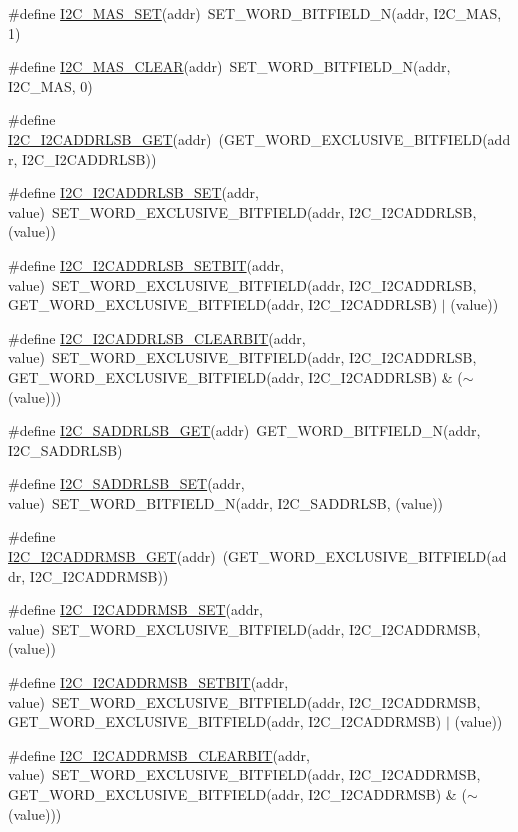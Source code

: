 \begin{DoxyCompactItemize}
\item 
\#define \hyperlink{a00557_aeb24282b8212aa301e882f01f5095530}{I2C\_\-MAS\_\-SET}(addr)~SET\_\-WORD\_\-BITFIELD\_\-N(addr, I2C\_\-MAS, 1)
\item 
\#define \hyperlink{a00557_a5f774c19bde66978bd546c0fa80bc329}{I2C\_\-MAS\_\-CLEAR}(addr)~SET\_\-WORD\_\-BITFIELD\_\-N(addr, I2C\_\-MAS, 0)
\item 
\#define \hyperlink{a00557_ad30f12598a025bf39ae94fba0321454c}{I2C\_\-I2CADDRLSB\_\-GET}(addr)~(GET\_\-WORD\_\-EXCLUSIVE\_\-BITFIELD(addr, I2C\_\-I2CADDRLSB))
\item 
\#define \hyperlink{a00557_a43523c6228f8a23711eb17e71acc91ff}{I2C\_\-I2CADDRLSB\_\-SET}(addr, value)~SET\_\-WORD\_\-EXCLUSIVE\_\-BITFIELD(addr, I2C\_\-I2CADDRLSB, (value))
\item 
\#define \hyperlink{a00557_a4551347f7b9dda948878fc6e37fe4370}{I2C\_\-I2CADDRLSB\_\-SETBIT}(addr, value)~SET\_\-WORD\_\-EXCLUSIVE\_\-BITFIELD(addr, I2C\_\-I2CADDRLSB, GET\_\-WORD\_\-EXCLUSIVE\_\-BITFIELD(addr, I2C\_\-I2CADDRLSB) $|$ (value))
\item 
\#define \hyperlink{a00557_a0dcf201bcd0928382c78f1a2be622ebe}{I2C\_\-I2CADDRLSB\_\-CLEARBIT}(addr, value)~SET\_\-WORD\_\-EXCLUSIVE\_\-BITFIELD(addr, I2C\_\-I2CADDRLSB, GET\_\-WORD\_\-EXCLUSIVE\_\-BITFIELD(addr, I2C\_\-I2CADDRLSB) \& ($\sim$(value)))
\item 
\#define \hyperlink{a00557_a4227216b259d552fa00679e55afb1ad6}{I2C\_\-SADDRLSB\_\-GET}(addr)~GET\_\-WORD\_\-BITFIELD\_\-N(addr, I2C\_\-SADDRLSB)
\item 
\#define \hyperlink{a00557_ad30491528a15715d07180256a66ef237}{I2C\_\-SADDRLSB\_\-SET}(addr, value)~SET\_\-WORD\_\-BITFIELD\_\-N(addr, I2C\_\-SADDRLSB, (value))
\item 
\#define \hyperlink{a00557_ab6a41270eb4dd576a417213ae9281136}{I2C\_\-I2CADDRMSB\_\-GET}(addr)~(GET\_\-WORD\_\-EXCLUSIVE\_\-BITFIELD(addr, I2C\_\-I2CADDRMSB))
\item 
\#define \hyperlink{a00557_a88cdfc26372e3b34f2bbe1987cdeff04}{I2C\_\-I2CADDRMSB\_\-SET}(addr, value)~SET\_\-WORD\_\-EXCLUSIVE\_\-BITFIELD(addr, I2C\_\-I2CADDRMSB, (value))
\item 
\#define \hyperlink{a00557_a955fcf9bafc256b424d55871ef869472}{I2C\_\-I2CADDRMSB\_\-SETBIT}(addr, value)~SET\_\-WORD\_\-EXCLUSIVE\_\-BITFIELD(addr, I2C\_\-I2CADDRMSB, GET\_\-WORD\_\-EXCLUSIVE\_\-BITFIELD(addr, I2C\_\-I2CADDRMSB) $|$ (value))
\item 
\#define \hyperlink{a00557_a3e58fb7eb88b89043385d583deb08331}{I2C\_\-I2CADDRMSB\_\-CLEARBIT}(addr, value)~SET\_\-WORD\_\-EXCLUSIVE\_\-BITFIELD(addr, I2C\_\-I2CADDRMSB, GET\_\-WORD\_\-EXCLUSIVE\_\-BITFIELD(addr, I2C\_\-I2CADDRMSB) \& ($\sim$(value)))

\end{DoxyCompactItemize}
